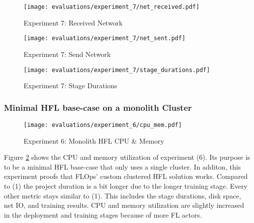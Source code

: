 \begin{figure}[p]
    \begin{adjustwidth}{-0.2\paperwidth}{-0.2\paperwidth}
        \centering
        \texttt{[image: evaluations/experiment\_7/net\_received.pdf]}
        \caption{Experiment 7: Received Network}
        \label{fig:eval_7_net_received}
    \end{adjustwidth}

    \begin{adjustwidth}{-0.2\paperwidth}{-0.2\paperwidth}
        \centering
        \texttt{[image: evaluations/experiment\_7/net\_sent.pdf]}
        \caption{Experiment 7: Send Network}
        \label{fig:eval_7_net_send}
    \end{adjustwidth}

    \begin{adjustwidth}{-0.2\paperwidth}{-0.2\paperwidth}
        \centering
        \texttt{[image: evaluations/experiment\_7/stage\_durations.pdf]}
        \caption{Experiment 7: Stage Durations}
        \label{fig:eval_7_stage_durations}
    \end{adjustwidth}
\end{figure}

\pagebreak

\subsubsection{Minimal HFL base-case on a monolith Cluster}

\begin{figure}[H]
    \begin{adjustwidth}{-0.2\paperwidth}{-0.2\paperwidth}
        \centering
        \texttt{[image: evaluations/experiment\_6/cpu\_mem.pdf]}
        \caption{Experiment 6: Monolith HFL CPU \& Memory}
        \label{fig:eval_6_cpu_mem}
    \end{adjustwidth}
\end{figure}

Figure \ref{fig:eval_6_cpu_mem} shows the CPU and memory utilization of experiment (6).
Its purpose is to be a minimal HFL base-case that only uses a single cluster.
In additon, this experiment proofs that FLOps' custom clustered HFL solution works.
Compared to (1) the project duration is a bit longer due to the longer training stage.
Every other metric stays similar to (1).
This includes the stage durations, disk space, net IO, and training results.
CPU and memory utilization are slightly increased in the deployment and training stages because of more FL actors.


